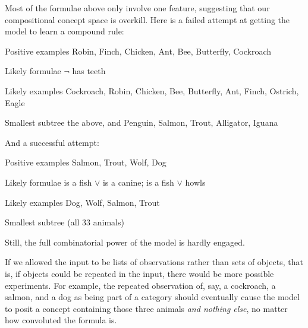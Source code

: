 \documentclass[apacite,jou]{apa6}
\newenvironment{rdescription}%
		{\begin{description}\raggedright}{\end{description}}
\begin{document}
Most of the formulae above only involve one feature, suggesting that
our compositional concept space is overkill. 
Here is a failed attempt
at getting the model to learn a compound rule:

\begin{rdescription}
\item[Positive examples] Robin, Finch, Chicken, Ant,
	 Bee, Butterfly, Cockroach
\item[Likely formulae] $\neg$ has teeth
\item[Likely examples] Cockroach, Robin, Chicken, Bee, Butterfly,
	Ant, Finch, Ostrich, Eagle
\item[Smallest subtree]
	the above, and Penguin, Salmon, Trout, Alligator, Iguana
\end{rdescription}

And a successful attempt:

\begin{rdescription}
\item[Positive examples] Salmon, Trout, Wolf, Dog
\item[Likely formulae] is a fish $\vee$ is a canine;
	 is a fish $\vee$ howls
\item[Likely examples]
	Dog, Wolf, Salmon, Trout
\item[Smallest subtree]
	(all 33 animals)
\end{rdescription}

Still, the full combinatorial power of the model is hardly engaged.

If we allowed the input to be lists of observations rather than
sets of objects, that is, if objects could be repeated in the input,
there would be more possible experiments. For example, the repeated
observation of, say, a cockroach, a salmon, and a dog as being
part of a category should eventually cause the model to 
posit a concept containing those three animals \emph{and nothing else},
no matter how convoluted the formula is.


\end{document}
